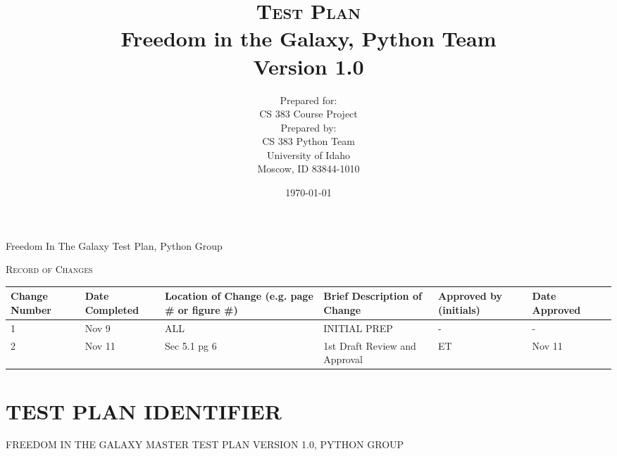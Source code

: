 \documentclass[report]{article}
\begin{document}
\title{\textsc{Test Plan}
  \\ Freedom in the Galaxy, Python Team
  \vspace{10 mm}
  \\ Version 1.0
  \vspace{10 mm}}
  
\date{\today}

\author{Prepared for:
  \\ CS 383 Course Project
  \vspace{10 mm}
  \\Prepared by:
  \\ CS 383 Python Team
  \\ University of Idaho
  \\ Moscow, ID 83844-1010
  \vspace{10 mm}}


\maketitle
\newpage 

\begin{center}
\noindent Freedom In The Galaxy Test Plan, Python Group

\vspace{10 mm}

\noindent \textsc{Record of Changes}   

\vspace{10 mm}


\begin{tabularx}{\textwidth}{| X | X | X | X | X | X | X |}
  \hline
  \textbf{Change Number} &
    \textbf{Date Completed} &
    \textbf{Location of Change (e.g. page \# or figure \#)} &
    \textbf{Brief Description of Change} &
    \textbf{Approved by (initials)} &
    \textbf{Date Approved} 
    \\ \hline 1 & Nov 9 & ALL  & INITIAL PREP & - & -
    \\ \hline 2 & Nov 11 & Sec 5.1 pg 6 & 1st Draft Review and Approval & ET & Nov 11  
    \\ \hline
\end{tabularx}
\end{center}
\newpage 
\tableofcontents
\newpage

\section[IDENTIFIER]{TEST PLAN IDENTIFIER}
FREEDOM IN THE GALAXY MASTER TEST PLAN VERSION 1.0, PYTHON GROUP
\end{document}
